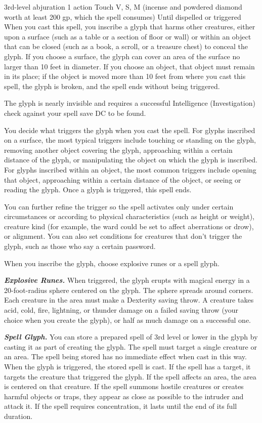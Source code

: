 \documentclass[10pt,twoside,twocolumn,openany]{book}
\newcommand\impact[1]{
	\textbf{\textit{#1}}
}
\begin{document}
{3rd-level abjuration}
{\color{action}1 action}
{Touch}
{V, S, M (incense and powdered diamond worth at least {\color{cost}200 gp}, which the spell consumes)}
{Until dispelled or triggered} 
When you cast this spell, you inscribe a glyph that harms other creatures, either upon a surface (such as a table or a section of floor or wall) or within an object that can be closed (such as a book, a scroll, or a treasure chest) to conceal the glyph. If you choose a surface, the glyph can cover an area of the surface no larger than 10 feet in diameter. If you choose an object, that object must remain in its place; if the object is moved more than 10 feet from where you cast this spell, the glyph is broken, and the spell ends without being triggered.

The glyph is nearly invisible and requires a successful Intelligence (Investigation) check against your spell save DC to be found.

You decide what triggers the glyph when you cast the spell. For glyphs inscribed on a surface, the most typical triggers include touching or standing on the glyph, removing another object covering the glyph, approaching within a certain distance of the glyph, or manipulating the object on which the glyph is inscribed. For glyphs inscribed within an object, the most common triggers include opening that object, approaching within a certain distance of the object, or seeing or reading the glyph. Once a glyph is triggered, this spell ends.

You can further refine the trigger so the spell activates only under certain circumstances or according to physical characteristics (such as height or weight), creature kind (for example, the ward could be set to affect aberrations or drow), or alignment. You can also set conditions for creatures that don't trigger the glyph, such as those who say a certain password.

When you inscribe the glyph, choose explosive runes or a spell glyph.

\impact{Explosive Runes.} When triggered, the glyph erupts with magical energy in a 20-foot-radius sphere centered on the glyph. The sphere spreads around corners. Each creature in the area must make a Dexterity saving throw. A creature takes  acid, cold, fire, lightning, or thunder damage on a failed saving throw (your choice when you create the glyph), or half as much damage on a successful one.

\impact{Spell Glyph.} You can store a prepared spell of 3rd level or lower in the glyph by casting it as part of creating the glyph. The spell must target a single creature or an area. The spell being stored has no immediate effect when cast in this way. When the glyph is triggered, the stored spell is cast. If the spell has a target, it targets the creature that triggered the glyph. If the spell affects an area, the area is centered on that creature. If the spell summons hostile creatures or creates harmful objects or traps, they appear as close as possible to the intruder and attack it. If the spell requires concentration, it lasts until the end of its full duration.
\end{document}
